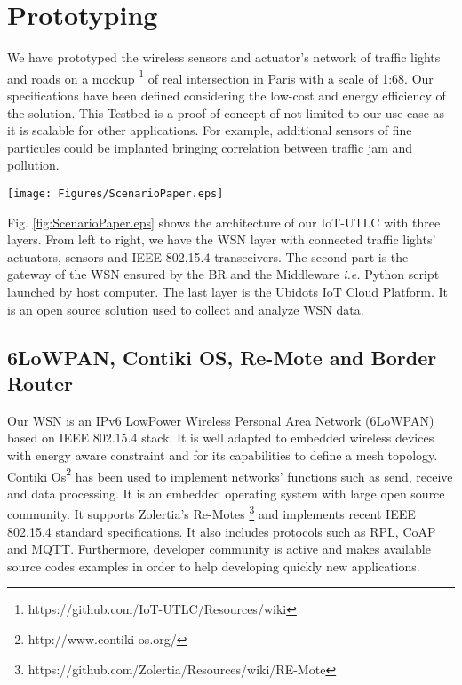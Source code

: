 \section{Prototyping} \label{sec:Experimentation}

We have prototyped the wireless sensors and actuator's network of traffic lights and roads on a mockup \footnote{https://github.com/IoT-UTLC/Resources/wiki} of real intersection in Paris with a scale of 1:68.
Our specifications have been defined considering the low-cost and energy efficiency of the solution.
This Testbed is a proof of concept of not limited to our use case as it is scalable for other applications.
For example,
	additional sensors of fine particules could be implanted bringing correlation between traffic jam and pollution.

\begin{figure*}[!htb]
\centering
\texttt{[image: Figures/ScenarioPaper.eps]}
\caption{Architecture of  Iot-UTLC}
\label{fig:ScenarioPaper.eps}
\end{figure*}

Fig.
\ref{fig:ScenarioPaper.eps} shows the architecture of our IoT-UTLC with three layers.
From left to right,
	we have the WSN layer with connected traffic lights’ actuators,
	sensors and IEEE 802.15.4 transceivers.
The second part is the gateway of the WSN ensured by the BR and the Middleware \emph{i.e.} Python script launched by host computer.
The last layer is the Ubidots IoT Cloud Platform.
It is an open source solution used to collect and analyze WSN data.

\subsection{6LoWPAN, Contiki OS, Re-Mote and Border Router} \label{Sec:Contiki}

Our WSN is an IPv6 LowPower Wireless Personal Area Network (6LoWPAN) based on IEEE 802.15.4 stack.
It is well adapted to embedded wireless devices with energy aware constraint and for its capabilities to define a mesh topology.
Contiki Os\footnote{http://www.contiki-os.org/} has been used to implement networks' functions such as send,
	receive and data processing.
It is an embedded operating system with large open source community.
It supports Zolertia's Re-Motes \footnote{https://github.com/Zolertia/Resources/wiki/RE-Mote} and implements recent IEEE 802.15.4 standard specifications.
It also includes protocols such as RPL,
	CoAP and MQTT.
Furthermore,
	developer community is active and makes available source codes examples in order to help developing quickly new applications.

